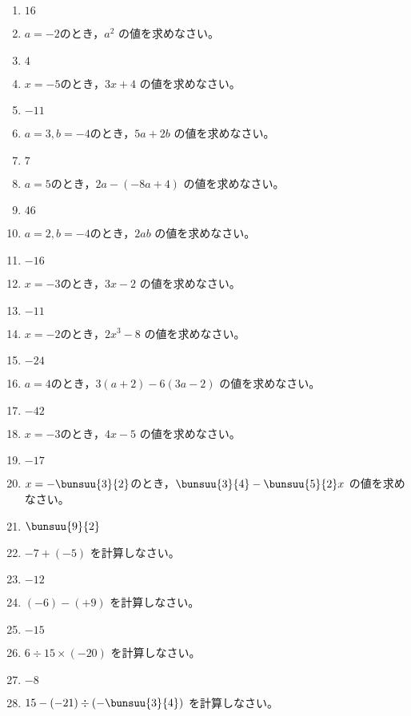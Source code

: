 \documentclass[uplatex,a4j,11pt]{jsreport}
\begin{document}
\begin{multicols}{2}
\begin{enumerate}
    \item $16$
    \item $a=-2$のとき，$a^2$ の値を求めなさい。%
    \item $4$
    \item $x=-5$のとき，$3x+4$ の値を求めなさい。%
    \item $-11$
    \item $a=3, b=-4$のとき，$5a+2b$ の値を求めなさい。%
    \item $7$
    \item $a=5$のとき，$2a-(-8a+4)$ の値を求めなさい。%
    \item $46$
    \item $a=2, b=-4$のとき，$2ab$ の値を求めなさい。%
    \item $-16$
    \item $x=-3$のとき，$3x-2$ の値を求めなさい。%
    \item $-11$
    \item $x=-2$のとき，$2x^3-8$ の値を求めなさい。%
    \item $-24$
    \item $a=4$のとき，$3(a+2)-6(3a-2)$ の値を求めなさい。%
    \item $-42$
    \item $x=-3$のとき，$4x-5$ の値を求めなさい。%
    \item $-17$
    \item $x=-\bunsuu{3}{2}$のとき，$\bunsuu{3}{4}-\bunsuu{5}{2}x$ の値を求めなさい。%
    \item $\bunsuu{9}{2}$
    \item $-7+(-5)$ を計算しなさい。%
    \item $-12$
    \item $(-6)-(+9)$ を計算しなさい。%
    \item $-15$
    \item $6\div15\times(-20)$ を計算しなさい。%
    \item $-8$
    \item $15-(-21)\div\left(-\bunsuu{3}{4}\right)$ を計算しなさい。%

\end{enumerate}
\end{multicols}
\end{document}
